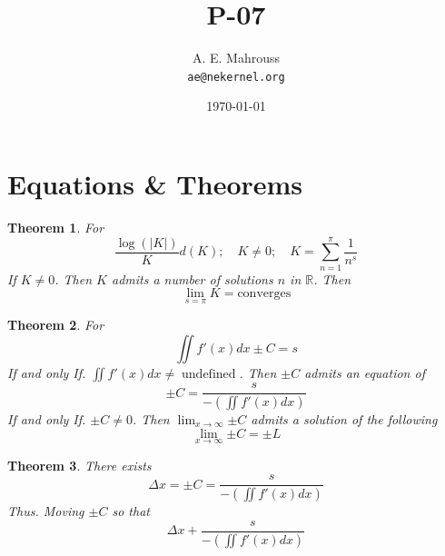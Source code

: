 \documentclass[11pt, a4paper]{article}
\title{P-07}
\author{A. E. Mahrouss\\\texttt{ae@nekernel.org}}
\date{\today}
\theoremstyle{plain}
\newtheorem{theorem}{Theorem}[section]
\theoremstyle{definition}
\theoremstyle{remark}
\begin{document}
\twocolumn[{%
  \maketitle
  \vspace{-0.5em}
  \vspace{0.8em}
  \rule{\linewidth}{0.4pt}
  \vspace{1em}
}]

\maketitle

\section{Equations \& Theorems}

\begin{theorem}
For
\begin{equation}
    \frac{\log(|K|)}{K} d(K); \quad K \neq 0; \quad K=\sum_{n=1}^{\pi} \frac{1}{n^s}
\end{equation}
If $K \neq 0$. Then $K$ admits a number of solutions $n$ in $\mathbb{R}$. Then
\begin{equation}
  \lim_{s=\pi} K = \text{converges}
\end{equation}
\end{theorem}

\begin{theorem}
For
\begin{equation}
  \iint f'(x) dx \pm C = s
\end{equation}
If and only If. $\iint f'(x) dx \neq \operatorname{undefined}$. Then $\pm C$ admits an equation of
\begin{equation}
  \pm C = \frac{s}{-(\iint f'(x) dx)}
\end{equation}
If and only If. $\pm C \neq 0$. Then $\lim_{x\to \infty}{\pm C}$ admits a solution of the following
\begin{equation}
  \lim_{x\to \infty}{\pm C} = \pm L
\end{equation}
\end{theorem}

\begin{theorem}
There exists
\begin{equation}
\Delta x = \pm C = \frac{s}{-(\iint f'(x) dx)}
\end{equation}
Thus. Moving $\pm C$ so that 
\begin{equation}
  \Delta x + \frac{s}{-(\iint f'(x) dx)}
\end{equation}
\end{theorem}
\end{document}
